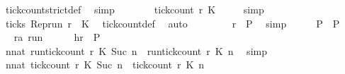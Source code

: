 \begin{isabellebody}
\ tick{\isacharunderscore}count{\isacharunderscore}strict{\isacharunderscore}def\ \isamarkupfalse%
\ simp\isanewline
\ \ \ \ \isamarkupfalse%
\ \isamarkupfalse%
\ {\isacartoucheopen}tick{\isacharunderscore}count\ r\ K\ {}\ {\isacharequal}\ {}{\isacartoucheclose}\ \isamarkupfalse%
\ simp\isanewline
\ \ \ \ \isamarkupfalse%
\ {\isacartoucheopen}{\isasymnot}ticks\ {\isacharparenleft}{\isacharparenleft}Rep{\isacharunderscore}run\ r{\isacharparenright}\ {}\ K\ \isamarkupfalse%
\ tick{\isacharunderscore}count{\isacharunderscore}def\ \isamarkupfalse%
\ auto\isanewline
\ \ \ \ \isamarkupfalse%
\ {\isacharasterisk}\ \isamarkupfalse%
\ {\isacartoucheopen}r\ {\isasymin}\ {\isacharquery}P{\isacharprime}{\isacartoucheclose}\ \isamarkupfalse%
\ simp\isanewline
\ \ \isacommand{{\isacharbraceright}}\isamarkupfalse%
\ \isamarkupfalse%
\ {\isacartoucheopen}{\isacharquery}P\ {\isasymsubseteq}\ {\isacharquery}P{\isacharprime}{\isacartoucheclose}\ \isacommand{{\isachardot}{\isachardot}}\isamarkupfalse%
\isanewline
\ \ \isacommand{{\isacharbraceleft}}\isamarkupfalse%
\ \isamarkupfalse%
\ r{\isacharcolon}{\isacharcolon}{\isacartoucheopen}{\isacharprime}a\ run{\isacartoucheclose}\isanewline
\ \ \ \ \isamarkupfalse%
\ h{\isacharcolon}{\isacartoucheopen}r\ {\isasymin}\ {\isacharquery}P{\isacharprime}{\isacartoucheclose}\isanewline
\ \ \ \ \isamarkupfalse%
\ {\isacartoucheopen}{\isasymforall}n{\isacharcolon}{\isacharcolon}nat{\isachardot}\ {\isacharparenleft}run{\isacharunderscore}tick{\isacharunderscore}count\ r\ K\ {\isacharparenleft}Suc\ n{\isacharparenright}{\isacharparenright}\ {\isasymle}\ {\isacharparenleft}run{\isacharunderscore}tick{\isacharunderscore}count\ r\ K\ n{\isacharparenright}{\isacartoucheclose}\ \isamarkupfalse%
\ simp\isanewline
\ \ \ \ \isamarkupfalse%
\ {\isacartoucheopen}{\isasymforall}n{\isacharcolon}{\isacharcolon}nat{\isachardot}\ {\isacharparenleft}tick{\isacharunderscore}count\ r\ K\ {\isacharparenleft}Suc\ n{\isacharparenright}{\isacharparenright}\ {\isasymle}\ {\isacharparenleft}tick{\isacharunderscore}count\ r\ K\ n{\isacharparenright}{\isacartoucheclose}\isanewline

\end{isabellebody}
